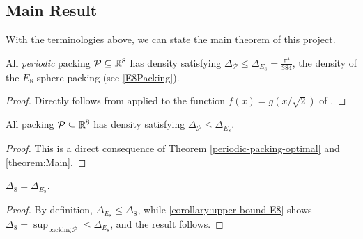 \subsection{Main Result}

With the terminologies above, we can state the main theorem of this project.

\begin{theorem}\label{theorem:CE_Main}
  All \emph{periodic} packing $\mathcal{P} \subseteq \mathbb{R}^8$ has density satisfying $\Delta_{\mathcal{P}} \leq \Delta_{E_8} = \frac{\pi^4}{384}$, the density of the $E_8$ sphere packing (see \cref{E8Packing}).
\end{theorem}
\begin{proof}
  Directly follows from  applied to the function $f(x)=g(x/\sqrt{2})$ of .
\end{proof}

\begin{corollary}\label{corollary:upper-bound-E8}
  All packing $\mathcal{P} \subseteq \mathbb{R}^8$ has density satisfying $\Delta_{\mathcal{P}} \leq \Delta_{E_8}$.
\end{corollary}
\begin{proof}
  This is a direct consequence of Theorem \cref{periodic-packing-optimal} and \cref{theorem:Main}.
\end{proof}

\begin{corollary}\label{MainTheorem}
  $\Delta_8 = \Delta_{E_8}$.
\end{corollary}
\begin{proof}
  By definition, $\Delta_{E_8} \leq \Delta_8$, while \cref{corollary:upper-bound-E8} shows $\Delta_8 = \sup_{\mathrm{packing} \, \mathcal{P}} \leq \Delta_{E_8}$, and the result follows.
\end{proof}
